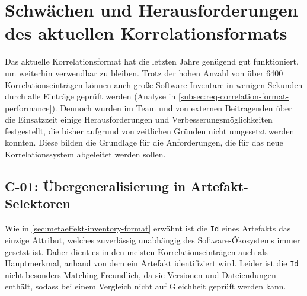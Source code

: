 \section{Schwächen und Herausforderungen des aktuellen Korrelationsformats}\label{sec:current-correlation-weaknesses}


Das aktuelle Korrelationsformat hat die letzten Jahre genügend gut funktioniert, um weiterhin verwendbar zu bleiben.
Trotz der hohen Anzahl von über 6400 Korrelationseinträgen können auch große Software-Inventare in wenigen Sekunden durch alle Einträge geprüft werden (Analyse in \autoref{subsec:req-correlation-format-performance}).
Dennoch wurden im Team und von externen Beitragenden über die Einsatzzeit einige Herausforderungen und Verbesserungsmöglichkeiten festgestellt, die bisher aufgrund von zeitlichen Gründen nicht umgesetzt werden konnten.
Diese bilden die Grundlage für die Anforderungen, die für das neue Korrelationssystem abgeleitet werden sollen.

\subsection{C-01: Übergeneralisierung in Artefakt-Selektoren}\label{subsec:c-01-unspezifische-identifikation-von-artefakten}

%
%

Wie in \autoref{sec:metaeffekt-inventory-format} erwähnt ist die \texttt{Id} eines Artefakts das einzige Attribut, welches zuverlässig unabhängig des Software-Ökosystems immer gesetzt ist.
Daher dient es in den meisten Korrelationseinträgen auch als Hauptmerkmal, anhand von dem ein Artefakt identifiziert wird.
Leider ist die \texttt{Id} nicht besonders Matching-Freundlich, da sie Versionen und Dateiendungen enthält, sodass bei einem Vergleich nicht auf Gleichheit geprüft werden kann.

